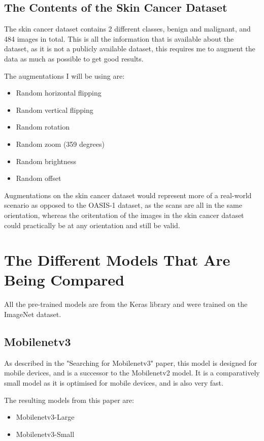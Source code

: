 \documentclass[]{final_report}
\begin{document}
\section{The Contents of the Skin Cancer Dataset}

The skin cancer dataset\cite{TAN2019105725} contains 2 different classes, benign and malignant, and 484 images in total.
This is all the information that is available about the dataset, as it is not a publicly available dataset, this requires me to augment the data as much as possible to get good results.

The augmentations I will be using are:
\begin{itemize}
  \item Random horizontal flipping
  \item Random vertical flipping
  \item Random rotation
  \item Random zoom (359 degrees)
  \item Random brightness
  \item Random offset
\end{itemize}

Augmentations on the skin cancer dataset would represent more of a real-world scenario as opposed to the OASIS-1 dataset, as the scans are all in the same orientation, whereas the oritentation of the images in the skin cancer dataset could practically be at any orientation and still be valid.

\chapter{The Different Models That Are Being Compared}

All the pre-trained models are from the Keras library\cite{Keras} and were trained on the ImageNet dataset\cite{ImageNet}.

\section{Mobilenetv3}

As described in the "Searching for Mobilenetv3" paper\cite{DBLP:journals/corr/abs-1905-02244}, this model is designed for mobile devices, and is a successor to the Mobilenetv2 model.
It is a comparatively small model as it is optimised for mobile devices, and is also very fast.

The resulting models from this paper are:
\begin{itemize}
  \item Mobilenetv3-Large
  \item Mobilenetv3-Small
\end{itemize}
\end{document}
